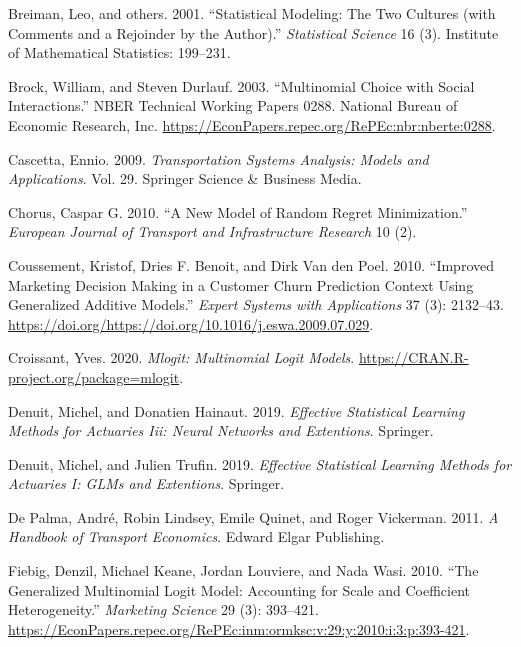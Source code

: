 \documentclass[12pt,]{article}
\begin{document}
\leavevmode\hypertarget{ref-breiman2001stat}{}%
Breiman, Leo, and others. 2001. ``Statistical Modeling: The Two Cultures
(with Comments and a Rejoinder by the Author).'' \emph{Statistical
Science} 16 (3). Institute of Mathematical Statistics: 199--231.

\leavevmode\hypertarget{ref-brock2003mcsi}{}%
Brock, William, and Steven Durlauf. 2003. ``Multinomial Choice with
Social Interactions.'' NBER Technical Working Papers 0288. National
Bureau of Economic Research, Inc.
\url{https://EconPapers.repec.org/RePEc:nbr:nberte:0288}.

\leavevmode\hypertarget{ref-cascetta2009tr}{}%
Cascetta, Ennio. 2009. \emph{Transportation Systems Analysis: Models and
Applications}. Vol. 29. Springer Science \& Business Media.

\leavevmode\hypertarget{ref-chorus2010rrm}{}%
Chorus, Caspar G. 2010. ``A New Model of Random Regret Minimization.''
\emph{European Journal of Transport and Infrastructure Research} 10 (2).

\leavevmode\hypertarget{ref-coussement2010gam}{}%
Coussement, Kristof, Dries F. Benoit, and Dirk Van den Poel. 2010.
``Improved Marketing Decision Making in a Customer Churn Prediction
Context Using Generalized Additive Models.'' \emph{Expert Systems with
Applications} 37 (3): 2132--43.
\url{https://doi.org/https://doi.org/10.1016/j.eswa.2009.07.029}.

\leavevmode\hypertarget{ref-R-mlogit}{}%
Croissant, Yves. 2020. \emph{Mlogit: Multinomial Logit Models}.
\url{https://CRAN.R-project.org/package=mlogit}.

\leavevmode\hypertarget{ref-denuit2019as3}{}%
Denuit, Michel, and Donatien Hainaut. 2019. \emph{Effective Statistical
Learning Methods for Actuaries Iii: Neural Networks and Extentions}.
Springer.

\leavevmode\hypertarget{ref-denuit2019as1}{}%
Denuit, Michel, and Julien Trufin. 2019. \emph{Effective Statistical
Learning Methods for Actuaries I: GLMs and Extentions}. Springer.

\leavevmode\hypertarget{ref-depalma2011tr}{}%
De Palma, André, Robin Lindsey, Emile Quinet, and Roger Vickerman. 2011.
\emph{A Handbook of Transport Economics}. Edward Elgar Publishing.

\leavevmode\hypertarget{ref-fiebig2010gmlm}{}%
Fiebig, Denzil, Michael Keane, Jordan Louviere, and Nada Wasi. 2010.
``The Generalized Multinomial Logit Model: Accounting for Scale and
Coefficient Heterogeneity.'' \emph{Marketing Science} 29 (3): 393--421.
\url{https://EconPapers.repec.org/RePEc:inm:ormksc:v:29:y:2010:i:3:p:393-421}.
\end{document}
